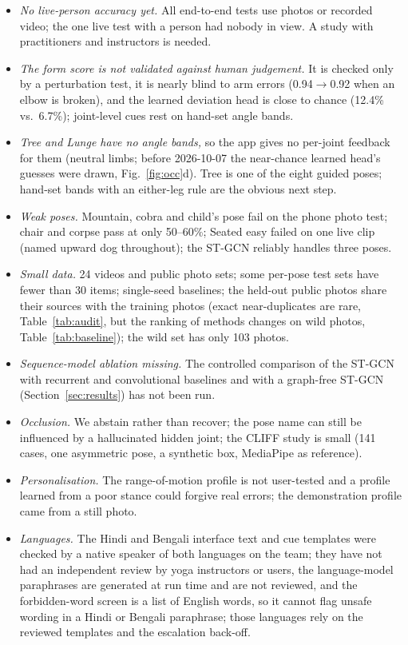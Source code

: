 \begin{itemize}
\item \emph{No live-person accuracy yet.} All end-to-end tests use photos or recorded video; the one live test with a person had nobody in view. A study with practitioners and instructors is needed.
\item \emph{The form score is not validated against human judgement.} It is checked only by a perturbation test, it is nearly blind to arm errors (0.94$\to$0.92 when an elbow is broken), and the learned deviation head is close to chance (12.4\% vs.\ 6.7\%); joint-level cues rest on hand-set angle bands.
\item \emph{Tree and Lunge have no angle bands,} so the app gives no per-joint feedback for them (neutral limbs; before 2026-10-07 the near-chance learned head's guesses were drawn, Fig.~\ref{fig:occ}d). Tree is one of the eight guided poses; hand-set bands with an either-leg rule are the obvious next step.
\item \emph{Weak poses.} Mountain, cobra and child's pose fail on the phone photo test; chair and corpse pass at only 50--60\%; Seated easy failed on one live clip (named upward dog throughout); the ST-GCN reliably handles three poses.
\item \emph{Small data.} 24 videos and public photo sets; some per-pose test sets have fewer than 30 items; single-seed baselines; the held-out public photos share their sources with the training photos (exact near-duplicates are rare, Table~\ref{tab:audit}, but the ranking of methods changes on wild photos, Table~\ref{tab:baseline}); the wild set has only 103 photos.
\item \emph{Sequence-model ablation missing.} The controlled comparison of the ST-GCN with recurrent and convolutional baselines and with a graph-free ST-GCN (Section~\ref{sec:results}) has not been run.
\item \emph{Occlusion.} We abstain rather than recover; the pose name can still be influenced by a hallucinated hidden joint; the CLIFF study is small (141 cases, one asymmetric pose, a synthetic box, MediaPipe as reference).
\item \emph{Personalisation.} The range-of-motion profile is not user-tested and a profile learned from a poor stance could forgive real errors; the demonstration profile came from a still photo.
\item \emph{Languages.} The Hindi and Bengali interface text and cue templates were checked by a native speaker of both languages on the team; they have not had an independent review by yoga instructors or users, the language-model paraphrases are generated at run time and are not reviewed, and the forbidden-word screen is a list of English words, so it cannot flag unsafe wording in a Hindi or Bengali paraphrase; those languages rely on the reviewed templates and the escalation back-off.

\end{itemize}
